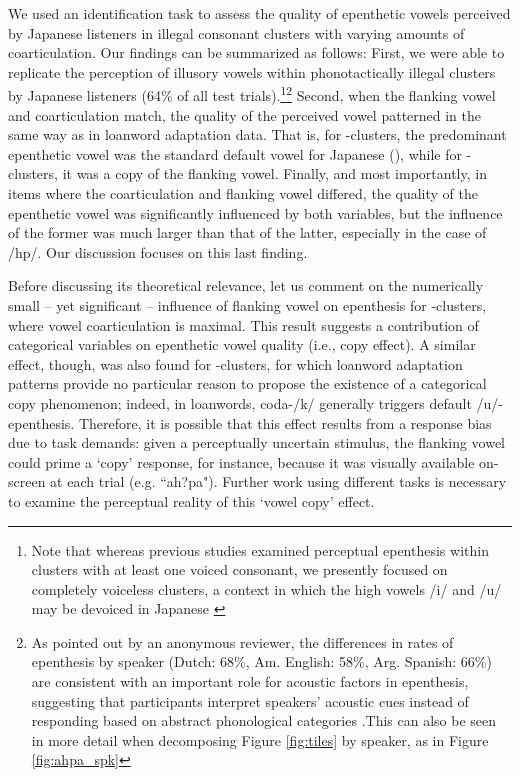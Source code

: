 We used an identification task to assess the quality of epenthetic vowels perceived by Japanese listeners in illegal consonant clusters with varying amounts of coarticulation. Our findings can be summarized as follows: First, we were able to replicate the perception of illusory vowels within phonotactically illegal clusters by Japanese listeners (64\% of all test trials).\footnote{Note that whereas previous studies examined perceptual epenthesis within clusters with at least one voiced consonant, we presently focused on completely voiceless clusters, a context in which the high vowels /i/ and /u/ may be devoiced in Japanese \cite{han1962, vance1987}}\footnote{As pointed out by an anonymous reviewer, the differences in rates of epenthesis by speaker (Dutch: 68\%, Am. English: 58\%, Arg. Spanish: 66\%) are consistent with an important role for acoustic factors in epenthesis, suggesting that participants interpret speakers' acoustic cues instead of responding based on abstract phonological categories \cite[cf.][]{wilson2014}.{\color{blue}This can also be seen in more detail when decomposing Figure \ref{fig:tiles} by speaker, as in Figure \ref{fig:ahpa_spk}}} %
Second, when the flanking vowel and coarticulation match, the quality of the perceived vowel patterned in the same way as in loanword adaptation data. That is, for -clusters, the predominant epenthetic vowel was the standard default vowel for Japanese (), while for -clusters, it was a copy of the flanking vowel. Finally, and most importantly, in items where the coarticulation and flanking vowel differed, the quality of the epenthetic vowel was significantly influenced by both variables, but the influence of the former was much larger than that of the latter, especially in the case of /hp/. Our discussion focuses on this last finding. 

Before discussing its theoretical relevance, let us comment on the numerically small -- yet significant -- influence of flanking vowel on epenthesis for -clusters, where vowel coarticulation is maximal. This result suggests a contribution of categorical variables on epenthetic vowel quality (i.e., copy effect). A similar effect, though, was also found for -clusters, for which loanword adaptation patterns provide no particular reason to propose the existence of a categorical copy phenomenon; indeed, in loanwords, coda-/k/ generally triggers default /u/-epenthesis. 
Therefore, it is possible that this effect results from a response bias due to task demands: given a perceptually uncertain stimulus, the flanking vowel could prime a `copy' response, for instance, because it was visually available on-screen at each trial (e.g. ``ah?pa"). Further work using different tasks is necessary to examine the perceptual reality of this `vowel copy' effect.

